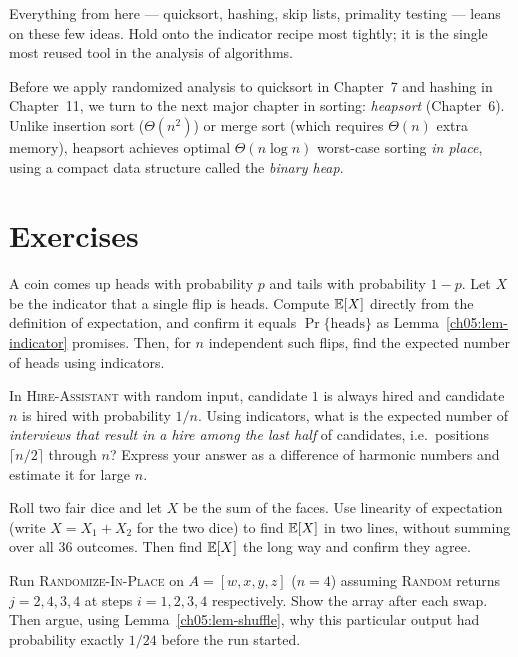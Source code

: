 Everything from here --- quicksort, hashing, skip lists, primality testing ---
leans on these few ideas. Hold onto the indicator recipe most tightly; it is the
single most reused tool in the analysis of algorithms.

Before we apply randomized analysis to quicksort in Chapter~7 and hashing
in Chapter~11, we turn to the next major chapter in sorting: \emph{heapsort}
(Chapter~6). Unlike insertion sort ($\Theta(n^2)$) or merge sort (which requires
$\Theta(n)$ extra memory), heapsort achieves optimal $\Theta(n \log n)$ worst-case
sorting \emph{in place}, using a compact data structure called the
\emph{binary heap}.

\section{Exercises}

\begin{exercise}
A coin comes up heads with probability $p$ and tails with probability $1-p$. Let
$X$ be the indicator that a single flip is heads. Compute $\mathbb{E}[X]$ directly from
the definition of expectation, and confirm it equals $\Pr\{\text{heads}\}$ as
Lemma~\ref{ch05:lem-indicator} promises. Then, for $n$ independent such flips,
find the expected number of heads using indicators.
\end{exercise}

\begin{exercise}
In \textsc{Hire-Assistant} with random input, candidate $1$ is always hired and
candidate $n$ is hired with probability $1/n$. Using indicators, what is the
expected number of \emph{interviews that result in a hire among the last half} of
candidates, i.e.\ positions $\lceil n/2\rceil$ through $n$? Express your answer
as a difference of harmonic numbers and estimate it for large $n$.
\end{exercise}

\begin{exercise}
Roll two fair dice and let $X$ be the sum of the faces. Use linearity of
expectation (write $X = X_1 + X_2$ for the two dice) to find $\mathbb{E}[X]$ in two
lines, without summing over all $36$ outcomes. Then find $\mathbb{E}[X]$ the long way and
confirm they agree.
\end{exercise}

\begin{exercise}
Run \textsc{Randomize-In-Place} on $A = [w,x,y,z]$ ($n=4$) assuming
\textsc{Random} returns $j = 2, 4, 3, 4$ at steps $i = 1,2,3,4$ respectively.
Show the array after each swap. Then argue, using
Lemma~\ref{ch05:lem-shuffle}, why this particular output had probability exactly
$1/24$ before the run started.
\end{exercise}

